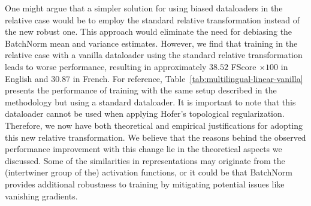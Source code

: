 \documentclass[../main.tex]{subfiles}
\begin{document}
\begin{table}[ht!]
\centering
{}
\caption{Linear vanilla dataloader (over two random seeds)}
\label{tab:multilingual-linear-vanilla}
\end{table}

One might argue that a simpler solution for using biased dataloaders in the relative case would be to employ the standard relative transformation instead of the new robust one. This approach would eliminate the need for debiasing the BatchNorm mean and variance estimates. However, we find that training in the relative case with a vanilla dataloader using the standard relative transformation leads to worse performance, resulting in approximately $38.52$ FScore $\times 100$ in English and $30.87$ in French. For reference, Table~\ref{tab:multilingual-linear-vanilla} presents the performance of training with the same setup described in the methodology but using a standard dataloader. It is important to note that this dataloader cannot be used when applying Hofer's topological regularization.\\

Therefore, we now have both theoretical and empirical justifications for adopting this new relative transformation. We believe that the reasons behind the observed performance improvement with this change lie in the theoretical aspects we discussed. Some of the similarities in representations may originate from the (intertwiner group of the) activation functions, or it could be that BatchNorm provides additional robustness to training by mitigating potential issues like vanishing gradients.\\
\end{document}
